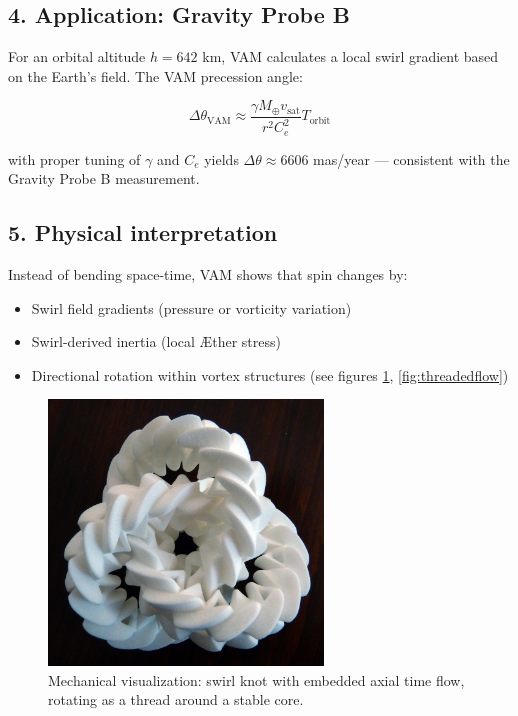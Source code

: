 \subsection*{4. Application: Gravity Probe B}
For an orbital altitude \( h = 642 \) km, VAM calculates a local swirl gradient based on the Earth's field. The VAM precession angle:

\[
\Delta\theta_\text{VAM} \approx \frac{\gamma M_{\oplus} v_\text{sat}}{r^2 C_e^2} T_\text{orbit}
\]

with proper tuning of \( \gamma \) and \( C_e \) yields \( \Delta\theta \approx 6606 \) mas/year — consistent with the Gravity Probe B measurement.

\subsection*{5. Physical interpretation}
Instead of bending space-time, VAM shows that spin changes by:
\begin{itemize}
\item Swirl field gradients (pressure or vorticity variation)
\item Swirl-derived inertia (local Æther stress)
\item Directional rotation within vortex structures (see figures \ref{fig:mechanicaltrefoil}, \ref{fig:threadedflow})
\end{itemize}

\begin{figure}[h!]
\centering
\includegraphics[width=0.65\textwidth]{mechanic_trefoil}
\caption{Mechanical visualization: swirl knot with embedded axial time flow, rotating as a thread around a stable core.}
\label{fig:mechanicaltrefoil}
\end{figure}

